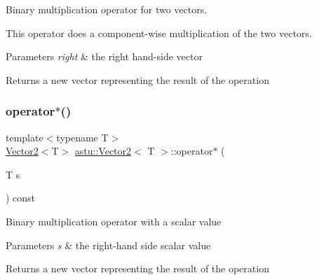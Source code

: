 Binary multiplication operator for two vectors.

This operator does a component-\/wise multiplication of the two vectors.


\begin{DoxyParams}{Parameters}
{\em right} & the right hand-\/side vector \\
\hline
\end{DoxyParams}
\begin{DoxyReturn}{Returns}
a new vector representing the result of the operation 
\end{DoxyReturn}
\mbox{\label{classastu_1_1Vector2_aa9cd4d74e0174cb0995613f989e42f12}} 
\subsubsection{\texorpdfstring{operator$\ast$()}{operator*()}\hspace{0.1cm}{\footnotesize\ttfamily [2/2]}}
{\footnotesize\ttfamily template$<$typename T$>$ \\
\hyperlink{classastu_1_1Vector2}{Vector2}$<$T$>$ \hyperlink{classastu_1_1Vector2}{astu\+::\+Vector2}$<$ T $>$\+::operator$\ast$ (\begin{DoxyParamCaption}\item[{T}]{s }\end{DoxyParamCaption}) const\hspace{0.3cm}{\ttfamily [inline]}}

Binary multiplication operator with a scalar value


\begin{DoxyParams}{Parameters}
{\em s} & the right-\/hand side scalar value \\
\hline
\end{DoxyParams}
\begin{DoxyReturn}{Returns}
a new vector representing the result of the operation 
\end{DoxyReturn}
\mbox{\label{classastu_1_1Vector2_a3416fb656aef7113d0261533f5a8a4aa}} 
